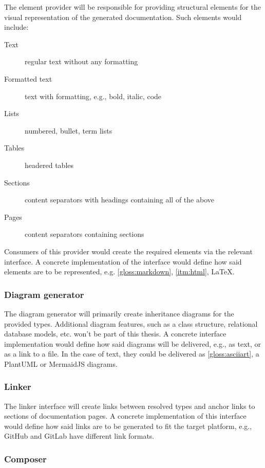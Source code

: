 The element provider will be responsible for providing structural elements for the visual representation of the generated documentation. Such elements would include:
\begin{description}
    \item[Text] regular text without any formatting
    \item[Formatted text] text with formatting, e.g., bold, italic, code
    \item[Lists] numbered, bullet, term lists
    \item[Tables] headered tables
    \item[Sections] content separators with headings containing all of the above
    \item[Pages] content separators containing sections
\end{description}

Consumers of this provider would create the required elements via the relevant interface.
A concrete implementation of the interface would define how said elements are to be represented, e.g. \ref{gloss:markdown}, \ref{itm:html}, \LaTeX.

\subsubsection{Diagram generator}

The diagram generator will primarily create inheritance diagrams for the provided types. Additional diagram features, such as a class structure, relational database models, etc. won't be part of this thesis.
A concrete interface implementation would define how said diagrams will be delivered, e.g., as text, or as a link to a file.
In the case of text, they could be delivered as \ref{gloss:asciiart}, a PlantUML or MermaidJS diagrams.

\subsubsection{Linker}

The linker interface will create links between resolved types and anchor links to sections of documentation pages.
A concrete implementation of this interface would define how said links are to be generated to fit the target platform, e.g., GitHub and GitLab have different link formats.

\subsubsection{Composer} \label{sec:composer}

